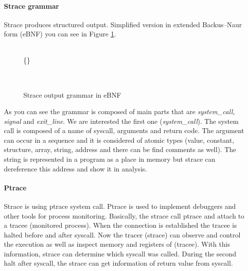 \paragraph{Strace grammar}
Strace produces structured output. Simplified version in extended Backus–Naur form (eBNF) \cite{ISO14977}
you can see in Figure \ref{strace_grammar_simple}.

\begin{figure}[h]
	\label{strace_grammar_simple}
	\begin{bnf*}
		{ \bnfor {} \bnfor {}}\\
		{ \bnfsp  {} \bnfsp \{\} \bnfsp {} \bnfsp {} \bnfsp {}}\\
			{ \bnfsp {} \bnfsp {}}\\
		{ \bnfsp {} \bnfsp {}}\\
	\end{bnf*}
	\caption{Strace output grammar in eBNF}
\end{figure}

As you can see the grammar is composed of main parts that are \emph{system\_call}, \emph{signal} and \emph{exit\_line}.
We are interested the first one (\emph{system\_call}).
The system call is composed of a name of syscall, arguments and return code.
The argument can occur in a sequence and it is considered of atomic types
(value, constant, structure, array, string, address and there can be find comments as  well).
The string is represented in a program as a place in memory but strace can dereference this address
and show it in analysis.

\paragraph{Ptrace}
Strace is using ptrace \cite{ptrace_man} system call.
Ptrace is used to  implement debuggers and other tools for process monitoring.
Basically, the strace call ptrace and attach to a tracee (monitored process).
When the connection is established the tracee is halted before and after syscall.
Now the tracer (strace) can observe and control the execution as well as inspect memory and registers of (tracee).
With this information, strace can determine which syscall was called.
During the second halt after syscall, the strace can get information of return value from syscall.

